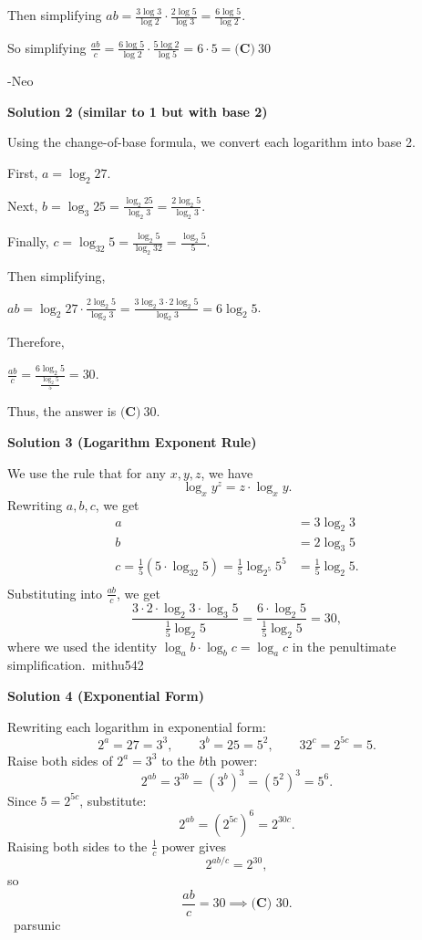 \begin{enumerate}
 Then simplifying $ab=\frac{3\log 3}{\log 2}\cdot\frac{2\log 5}{\log 3}=\frac{6\log 5}{\log 2}$.

 So simplifying $\frac{ab}{c}=\frac{6\log 5}{\log 2}\cdot\frac{5\log 2}{\log 5}=6\cdot 5= \boxed{\textbf{(C)}\ 30}$ 

 -Neo

 



\textbf{Solution 2 (similar to 1 but with base 2)}

Using the change-of-base formula, we convert each logarithm into base 2.

 First, $a=\log_2 27$.

 Next, $b=\log_3 25=\frac{\log_2 25}{\log_2 3}=\frac{2\log_2 5}{\log_2 3}$.

 Finally, $c=\log_{32}5=\frac{\log_2 5}{\log_2 32}=\frac{\log_2 5}{5}$.

 Then simplifying,

 $ab=\log_2 27\cdot\frac{2\log_2 5}{\log_2 3}=\frac{3\log_2 3\cdot2\log_2 5}{\log_2 3}=6\log_2 5$.

 Therefore,

 $\frac{ab}{c}=\frac{6\log_2 5}{\frac{\log_2 5}{5}}=\boxed{30}$.

 Thus, the answer is $\boxed{\textbf{(C)}\ 30}$.

 



\textbf{Solution 3 (Logarithm Exponent Rule)}

We use the rule that for any $x,y,z$, we have
 \[\log_x y^z=z\cdot \log_x y.\]Rewriting $a,b,c$, we get\begin{align*}a&=3\log_2 3 \\b&=2\log_3 5 \\c=\frac{1}{5}\left(5\cdot \log_{32} 5\right)=\frac{1}{5}\log_{2^5}5^5&=\frac{1}{5}\log_2 5. \\\end{align*}
Substituting into $\frac{ab}{c}$, we get
 \[\frac{3\cdot 2\cdot \log_2 3\cdot \log_3 5}{\frac{1}{5}\log_2 5}=\frac{6\cdot \log_2 5}{\frac{1}{5}\log_2 5}=\boxed{30},\]where we used the identity $\log_a b\cdot \log_b c=\log_a c$ in the penultimate simplification.~mithu542

 



\textbf{Solution 4 (Exponential Form)}

Rewriting each logarithm in exponential form:
 \[2^a = 27 = 3^3, \qquad 3^b = 25 = 5^2, \qquad 32^c = 2^{5c} = 5.\]Raise both sides of $2^a = 3^3$ to the $b$th power:
 \[2^{ab} = 3^{3b} = \left(3^b\right)^3 = \left(5^2\right)^3 = 5^6.\]Since $5 = 2^{5c}$, substitute:
 \[2^{ab} = \left(2^{5c}\right)^6 = 2^{30c}.\]Raising both sides to the $\frac{1}{c}$ power gives
 \[2^{ab/c} = 2^{30},\]so
 \[\frac{ab}{c} = 30 \implies \boxed{\textbf{(C) } 30}.\]~parsunic


\end{enumerate}
